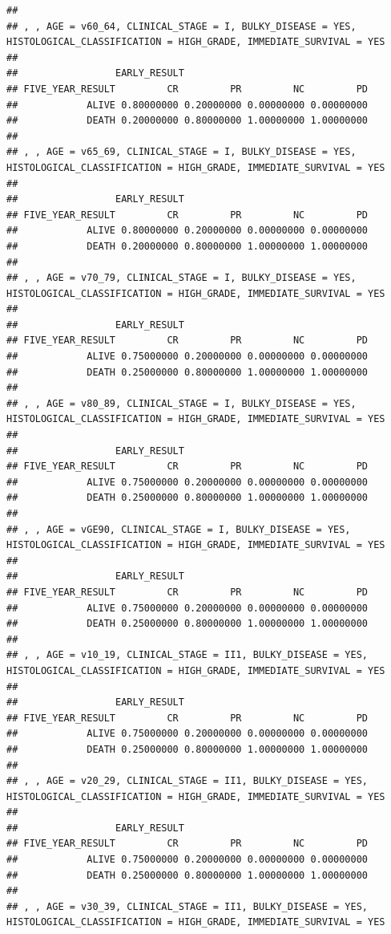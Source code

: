 \documentclass[]{article}
\begin{document}
\begin{verbatim}
## 
## , , AGE = v60_64, CLINICAL_STAGE = I, BULKY_DISEASE = YES, HISTOLOGICAL_CLASSIFICATION = HIGH_GRADE, IMMEDIATE_SURVIVAL = YES
## 
##                 EARLY_RESULT
## FIVE_YEAR_RESULT         CR         PR         NC         PD
##            ALIVE 0.80000000 0.20000000 0.00000000 0.00000000
##            DEATH 0.20000000 0.80000000 1.00000000 1.00000000
## 
## , , AGE = v65_69, CLINICAL_STAGE = I, BULKY_DISEASE = YES, HISTOLOGICAL_CLASSIFICATION = HIGH_GRADE, IMMEDIATE_SURVIVAL = YES
## 
##                 EARLY_RESULT
## FIVE_YEAR_RESULT         CR         PR         NC         PD
##            ALIVE 0.80000000 0.20000000 0.00000000 0.00000000
##            DEATH 0.20000000 0.80000000 1.00000000 1.00000000
## 
## , , AGE = v70_79, CLINICAL_STAGE = I, BULKY_DISEASE = YES, HISTOLOGICAL_CLASSIFICATION = HIGH_GRADE, IMMEDIATE_SURVIVAL = YES
## 
##                 EARLY_RESULT
## FIVE_YEAR_RESULT         CR         PR         NC         PD
##            ALIVE 0.75000000 0.20000000 0.00000000 0.00000000
##            DEATH 0.25000000 0.80000000 1.00000000 1.00000000
## 
## , , AGE = v80_89, CLINICAL_STAGE = I, BULKY_DISEASE = YES, HISTOLOGICAL_CLASSIFICATION = HIGH_GRADE, IMMEDIATE_SURVIVAL = YES
## 
##                 EARLY_RESULT
## FIVE_YEAR_RESULT         CR         PR         NC         PD
##            ALIVE 0.75000000 0.20000000 0.00000000 0.00000000
##            DEATH 0.25000000 0.80000000 1.00000000 1.00000000
## 
## , , AGE = vGE90, CLINICAL_STAGE = I, BULKY_DISEASE = YES, HISTOLOGICAL_CLASSIFICATION = HIGH_GRADE, IMMEDIATE_SURVIVAL = YES
## 
##                 EARLY_RESULT
## FIVE_YEAR_RESULT         CR         PR         NC         PD
##            ALIVE 0.75000000 0.20000000 0.00000000 0.00000000
##            DEATH 0.25000000 0.80000000 1.00000000 1.00000000
## 
## , , AGE = v10_19, CLINICAL_STAGE = II1, BULKY_DISEASE = YES, HISTOLOGICAL_CLASSIFICATION = HIGH_GRADE, IMMEDIATE_SURVIVAL = YES
## 
##                 EARLY_RESULT
## FIVE_YEAR_RESULT         CR         PR         NC         PD
##            ALIVE 0.75000000 0.20000000 0.00000000 0.00000000
##            DEATH 0.25000000 0.80000000 1.00000000 1.00000000
## 
## , , AGE = v20_29, CLINICAL_STAGE = II1, BULKY_DISEASE = YES, HISTOLOGICAL_CLASSIFICATION = HIGH_GRADE, IMMEDIATE_SURVIVAL = YES
## 
##                 EARLY_RESULT
## FIVE_YEAR_RESULT         CR         PR         NC         PD
##            ALIVE 0.75000000 0.20000000 0.00000000 0.00000000
##            DEATH 0.25000000 0.80000000 1.00000000 1.00000000
## 
## , , AGE = v30_39, CLINICAL_STAGE = II1, BULKY_DISEASE = YES, HISTOLOGICAL_CLASSIFICATION = HIGH_GRADE, IMMEDIATE_SURVIVAL = YES

\end{verbatim}
\end{document}

